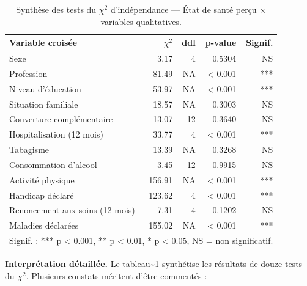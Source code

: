 \documentclass[11pt,a4paper]{memoirerecherche}
\begin{document}
\begin{table}[!h]
\centering
\caption{\label{tab:tab-chi2-synthese}Synthèse des tests du $\chi^2$ d'indépendance --- État de santé perçu $\times$ variables qualitatives.}
\centering
\fontsize{8}{10}\selectfont
\begin{tabular}[t]{lrrrr}
\toprule
Variable croisée & $\chi^2$ & ddl & p-value & Signif.\\
\midrule
Sexe & 3.17 & 4 & 0.5304 & NS\\
Profession & 81.49 & NA & < 0.001 & ***\\
Niveau d'éducation & 53.97 & NA & < 0.001 & ***\\
Situation familiale & 18.57 & NA & 0.3003 & NS\\
Couverture complémentaire & 13.07 & 12 & 0.3640 & NS\\
\addlinespace
Hospitalisation (12 mois) & 33.77 & 4 & < 0.001 & ***\\
Tabagisme & 13.39 & NA & 0.3268 & NS\\
Consommation d'alcool & 3.45 & 12 & 0.9915 & NS\\
Activité physique & 156.91 & NA & < 0.001 & ***\\
Handicap déclaré & 123.62 & 4 & < 0.001 & ***\\
\addlinespace
Renoncement aux soins (12 mois) & 7.31 & 4 & 0.1202 & NS\\
Maladies déclarées & 155.02 & NA & < 0.001 & ***\\
\bottomrule
\multicolumn{5}{l}{\rule{0pt}{1em}Signif. : *** p < 0.001, ** p < 0.01, * p < 0.05, NS = non significatif.}\\
\end{tabular}
\end{table}

\textbf{Interprétation détaillée.} Le tableau\textasciitilde\ref{tab:tab-chi2-synthese} synthétise les résultats de douze tests du \(\chi^2\). Plusieurs constats méritent d'être commentés :
\end{document}

